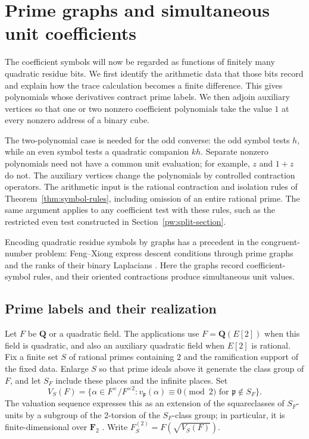\section{Prime graphs and simultaneous unit coefficients}\label{gr:section}

The coefficient symbols will now be regarded as functions of finitely
many quadratic residue bits. We first identify the arithmetic data that
those bits record and explain how the trace calculation becomes a
finite difference. This gives polynomials whose derivatives contract
prime labels. We then adjoin auxiliary vertices so that one or two
nonzero coefficient polynomials take the value $1$ at every nonzero
address of a binary cube.

The two-polynomial case is needed for the odd converse: the odd symbol
tests $h$, while an even symbol tests a quadratic companion $kh$.
Separate nonzero polynomials need not have a common unit evaluation;
for example, $z$ and $1+z$ do not. The auxiliary vertices change the
polynomials by controlled contraction operators. The arithmetic input
is the rational contraction and isolation rules of
Theorem~\ref{thm:symbol-rules}, including omission of an entire rational
prime. The same argument applies to any coefficient test with these
rules, such as the restricted even test constructed in
Section~\ref{pw:split-section}.

Encoding quadratic residue symbols by graphs has a precedent in the
congruent-number problem: Feng--Xiong express descent conditions through
prime graphs and the ranks of their binary Laplacians
\citep[\S2, Definitions~2.1 and~2.3 and Lemma~2.2]{FengXiong2004}.
Here the graphs record coefficient-symbol rules, and their oriented
contractions produce simultaneous unit values.

\subsection{Prime labels and their realization}

Let $F$ be $\mathbf Q$ or a quadratic field.  The applications use
$F=\mathbf Q(E[2])$ when this field is quadratic, and also an auxiliary
quadratic field when $E[2]$ is rational.  Fix a finite set $S$ of rational
primes containing $2$ and the ramification support of the fixed data.
Enlarge $S$ so that prime ideals above it generate the class group of $F$,
and let $S_F$ include these places and the infinite places.  Set
\[
 V_S(F)=\{\alpha\in F^\times/F^{\times2}:
       v_{\mathfrak p}(\alpha)\equiv0\pmod2
       \text{ for }\mathfrak p\notin S_F\}.
\]
The valuation sequence expresses this as an extension of the squareclasses
of $S_F$-units by a subgroup of the $2$-torsion of the $S_F$-class group;
in particular, it is finite-dimensional over $\mathbf F_2$
\citep[Theorems~4.4 and~5.11]{MilneANT2020}.
Write $F_S^{(2)}=F(\sqrt{V_S(F)})$.

